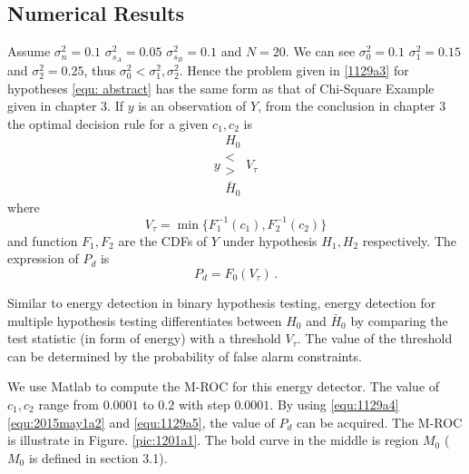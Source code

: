 \subsection{Numerical Results}
Assume $\sigma_n^2=0.1$ $\sigma_{s_A}^2=0.05$ $\sigma_{s_B}^2=0.1$ and $N=20$. We can see $\sigma_0^2=0.1$ $\sigma_1^2=0.15$ and $\sigma_2^2=0.25$, 
thus $\sigma_0^2 < \sigma_1^2, \sigma_2^2$. Hence the problem given in \eqref{1129a3} for hypotheses \eqref{equ: abstract} has the same form as that of Chi-Square Example given in chapter 3. 
If $y$ is an observation of $Y$, 
from the conclusion in chapter 3 the optimal  decision rule for a given $c_1, c_2$ is 
\begin{equation}
  y \substack{H_0 \\ < \\ > \\ \bar{H}_0} V_\tau
  \label{equ:1129a4}
\end{equation}
where 
\begin{equation}
  V_\tau = \min\{F_1^{-1}(c_1),  F_2^{-1}(c_2)\}
  \label{equ:2015may1a2}
\end{equation}
and function $F_1,  F_2$ are the CDFs of $Y$ under hypothesis $H_1, H_2$ respectively. The expression of $P_d$ is 
\begin{equation}
  P_d = F_0(V_\tau)\,.
  \label{equ:1129a5}
\end{equation}

Similar to energy detection in binary hypothesis testing, energy detection for multiple hypothesis testing differentiates between $H_0$ and $\bar{H}_0$ by comparing the test statistic (in form of energy) with a threshold $V_\tau$. The value of the threshold can be determined by the probability of false alarm constraints.   

We use Matlab to compute the M-ROC for this energy detector. The value of $c_1, c_2$ range from $0.0001$ to $0.2$ with step $0.0001$. By using \eqref{equ:1129a4} \eqref{equ:2015may1a2} and \eqref{equ:1129a5}, the value of $P_d$ can be acquired. The M-ROC is illustrate in Figure. \ref{pic:1201a1}. The bold curve in the middle is region $M_0$ ($M_0$ is defined in section 3.1). 

